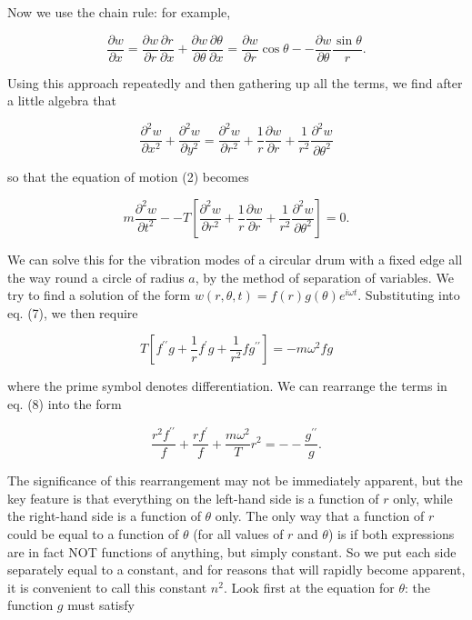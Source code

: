   Now we use the chain rule: for example, 

  $$\frac{\partial w}{\partial x} =\frac{\partial w}{\partial r} \frac{\partial 
  r}{\partial x} + \frac{\partial w}{\partial \theta} \frac{\partial 
  \theta}{\partial x}=\frac{\partial w}{\partial r} \cos \theta -- 
  \frac{\partial w}{\partial \theta} \frac{\sin \theta}{r} . \tag{5}$$ 

  Using this approach repeatedly and then gathering up all the terms, we find 
  after a little algebra that 

  $$\dfrac{\partial^2 w}{\partial x^2} + \dfrac{\partial^2 w}{\partial 
  y^2}=\dfrac{\partial^2 w}{\partial r^2} + \dfrac{1}{r} \dfrac{\partial 
  w}{\partial r}+ \dfrac{1}{r^2} \dfrac{\partial^2 w}{\partial \theta^2} 
  \tag{6}$$ 

  so that the equation of motion (2) becomes 

  $$m \frac{\partial^2 w}{\partial t^2} -- T \left[ \dfrac{\partial^2 
  w}{\partial r^2} + \dfrac{1}{r} \dfrac{\partial w}{\partial r}+ 
  \dfrac{1}{r^2} \dfrac{\partial^2 w}{\partial \theta^2} \right] =0 . \tag{7}$$ 

  We can solve this for the vibration modes of a circular drum with a fixed 
  edge all the way round a circle of radius $a$, by the method of separation of 
  variables. We try to find a solution of the form $w(r,\theta,t) = f(r) 
  g(\theta) e^{i \omega t}$. Substituting into eq. (7), we then require 

  $$T \left[ f^{\prime \prime} g +\frac{1}{r} f^{\prime} g+\frac{1}{r^2} f 
  g^{\prime \prime} \right] = -m \omega^2 f g \tag{8}$$ 

  where the prime symbol denotes differentiation. We can rearrange the terms in 
  eq. (8) into the form 

  $$\frac{ r^2 f^{\prime \prime}}{f} + \frac{ r f^{\prime}}{f} + \frac{m 
  \omega^2}{T}r^2 = -- \frac{g^{\prime \prime}}{g} . \tag{9}$$ 

  The significance of this rearrangement may not be immediately apparent, but 
  the key feature is that everything on the left-hand side is a function of $r$ 
  only, while the right-hand side is a function of $\theta$ only. The only way 
  that a function of $r$ could be equal to a function of $\theta$ (for all 
  values of $r$ and $\theta$) is if both expressions are in fact NOT functions 
  of anything, but simply constant. So we put each side separately equal to a 
  constant, and for reasons that will rapidly become apparent, it is convenient 
  to call this constant $n^2$. Look first at the equation for $\theta$: the 
  function $g$ must satisfy 

